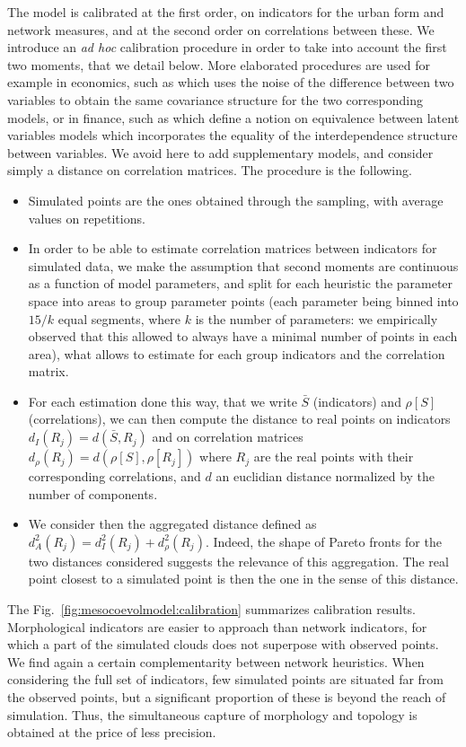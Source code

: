 The model is calibrated at the first order, on indicators for the urban form and network measures, and at the second order on correlations between these. We introduce an \emph{ad hoc} calibration procedure in order to take into account the first two moments, that we detail below. More elaborated procedures are used for example in economics, such as \cite{watson1993measures} which uses the noise of the difference between two variables to obtain the same covariance structure for the two corresponding models, or in finance, such as \cite{frey2001copulas} which define a notion on equivalence between latent variables models which incorporates the equality of the interdependence structure between variables. We avoid here to add supplementary models, and consider simply a distance on correlation matrices. The procedure is the following.
\begin{itemize}
	\item Simulated points are the ones obtained through the sampling, with average values on repetitions.
	\item In order to be able to estimate correlation matrices between indicators for simulated data, we make the assumption that second moments are continuous as a function of model parameters, and split for each heuristic the parameter space into areas to group parameter points (each parameter being binned into $15 / k$ equal segments, where $k$ is the number of parameters: we empirically observed that this allowed to always have a minimal number of points in each area), what allows to estimate for each group indicators and the correlation matrix.
	\item For each estimation done this way, that we write $\bar{S}$ (indicators) and $\rho [S]$ (correlations), we can then compute the distance to real points on indicators $d_I (R_j) = d(\bar{S},R_j)$ and on correlation matrices $d_{\rho} (R_j) = d(\rho [S],\rho[R_j])$ where $R_j$ are the real points with their corresponding correlations, and $d$ an euclidian distance normalized by the number of components.
	\item We consider then the aggregated distance defined as $d_A^2 (R_j) = d_I^2 (R_j) + d_{\rho}^2 (R_j)$. Indeed, the shape of Pareto fronts for the two distances considered suggests the relevance of this aggregation. The real point closest to a simulated point is then the one in the sense of this distance.
\end{itemize}


The Fig.~\ref{fig:mesocoevolmodel:calibration} summarizes calibration results. Morphological indicators are easier to approach than network indicators, for which a part of the simulated clouds does not superpose with observed points. We find again a certain complementarity between network heuristics. When considering the full set of indicators, few simulated points are situated far from the observed points, but a significant proportion of these is beyond the reach of simulation. Thus, the simultaneous capture of morphology and topology is obtained at the price of less precision.


